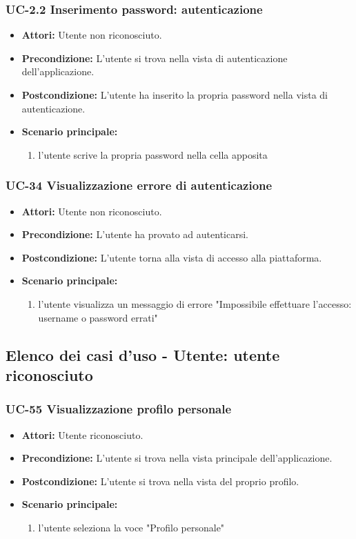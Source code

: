 \subsubsection{UC-2.2 Inserimento password: autenticazione}
\begin{itemize}
	\item \textbf{Attori:} Utente non riconosciuto.
			\item \textbf{Precondizione:} L'utente si trova nella vista di autenticazione dell'applicazione.
			\item \textbf{Postcondizione:} L'utente ha inserito la propria password nella vista di autenticazione.
			\item \textbf{Scenario principale:}
				\begin{enumerate}
					\item l'utente scrive la propria password nella cella apposita
				\end{enumerate}
\end{itemize}
		
\subsubsection{UC-34 Visualizzazione errore di autenticazione}
		\begin{itemize}
			\item \textbf{Attori:} Utente non riconosciuto.
			\item \textbf{Precondizione:} L'utente ha provato ad autenticarsi.
			\item \textbf{Postcondizione:} L'utente torna alla vista di accesso alla piattaforma.
			\item \textbf{Scenario principale:}
			\begin{enumerate}
				\item l'utente visualizza un messaggio di errore "Impossibile effettuare l'accesso: username o password errati"
			\end{enumerate}
		\end{itemize}
		
\subsection{Elenco dei casi d'uso - Utente: utente riconosciuto}
\subsubsection{UC-55 Visualizzazione profilo personale}
\begin{itemize}
	\item \textbf{Attori:} Utente riconosciuto.
	\item \textbf{Precondizione:} L'utente si trova nella vista principale dell'applicazione.
	\item \textbf{Postcondizione:} L'utente si trova nella vista del proprio profilo.
	\item \textbf{Scenario principale:}
		\begin{enumerate}
			\item l'utente seleziona la voce "Profilo personale"
		\end{enumerate}
\end{itemize}

